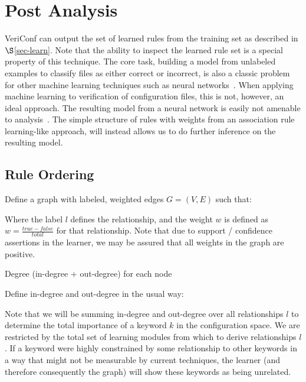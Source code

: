 
\section{Post Analysis}

VeriConf can output the set of learned rules from the training set as described in $\S$\ref{sec-learn}.
Note that the ability to inspect the learned rule set is a special property of this technique.
The core task, building a model from unlabeled examples to classify files as either correct or incorrect, is also a classic problem for other machine learning techniques such as neural networks~\cite{nn1,nn2,nn3}.
When applying machine learning to verification of configuration files, this is not, however, an ideal approach.
The resulting model from a neural network is easily not amenable to analysis~\cite{nnAnalysis1,nnAnalysis2}.
The simple structure of rules with weights from an association rule learning-like approach, will instead allows us to do further inference on the resulting model.

\subsection{Rule Ordering}
\label{sec:ruleorder}

Define a graph with labeled, weighted edges $G = (V,E)$ such that:
\iffalse
    V \def { keywords }

Where 

    E \def { (v_1, v_2, l, w) }
\fi

Where the label $l$ defines the relationship, and the weight $w$ is
defined as $w = \frac{true - false}{total}$ for that relationship.
Note that due to support / confidence assertions in the learner, we
may be assured that all weights in the graph are positive.

Degree (in-degree + out-degree) for each node 

Define in-degree and out-degree in the usual way:

\iffalse    IN_DEGREE(k) = ||

    $\forall keyword k \in rules, in\_degree()$
\fi

Note that we will be summing in-degree and out-degree over all
relationships $l$ to determine the total importance of
a keyword $k$ in the configuration space. We are restricted
by the total set of learning modules from which to derive
relationships $l$. If a keyword were highly constrained by some
relationship to other keywords in a way that might not be
measurable by current techniques, the learner (and therefore
consequently the graph) will show these keywords as being
unrelated.

